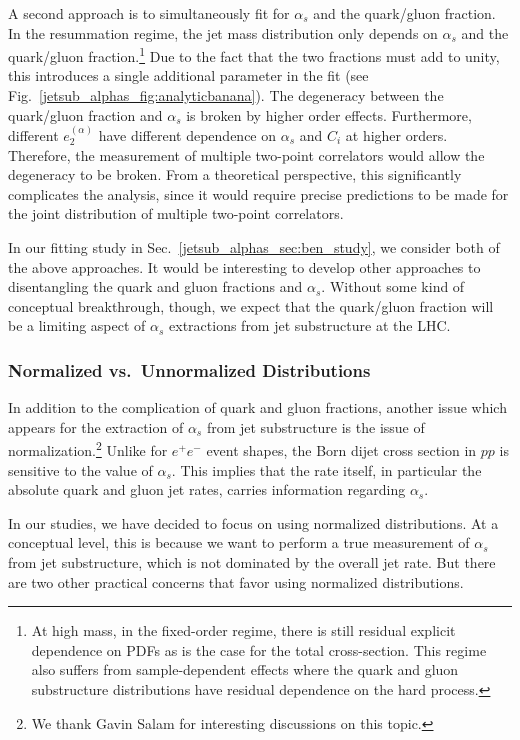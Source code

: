 \documentclass[11pt]{cernrep}
\begin{document}
A second approach is to simultaneously fit for $\alpha_s$ and the quark/gluon fraction.
%
In the resummation regime, the jet mass distribution only depends on $\alpha_s$ and the quark/gluon fraction.\footnote{At high mass, in the fixed-order regime, there is still residual explicit dependence on PDFs as is the case for the total cross-section.  This regime also suffers from sample-dependent effects where the quark and gluon substructure distributions have residual dependence on the hard process.}
%
Due to the fact that the two fractions must add to unity, this introduces a single additional parameter in the fit (see Fig.~\ref{jetsub_alphas_fig:analyticbanana}).
%
The degeneracy between the quark/gluon fraction and $\alpha_s$ is broken by higher order effects.
%
Furthermore, different $e_2^{(\alpha)}$ have different dependence on $\alpha_s$ and $C_i$ at higher orders.
%
Therefore, the measurement of multiple two-point correlators would allow the degeneracy to be broken.
%
From a theoretical perspective, this significantly complicates the analysis, since it would require precise
predictions to be made for the joint distribution of multiple two-point correlators.


In our fitting study in Sec.~\ref{jetsub_alphas_sec:ben_study}, we consider both of the above approaches.
%
It would be interesting to develop other approaches to disentangling the quark and gluon fractions and $\alpha_s$.
%
Without some kind of conceptual breakthrough, though, we expect that the quark/gluon fraction will be a limiting aspect of $\alpha_s$ extractions from jet substructure at the LHC.

\subsubsection{Normalized vs.\ Unnormalized Distributions}
\label{subjetsub_alphas_sec:norm}

In addition to the complication of quark and gluon fractions, another issue which appears for the extraction of $\alpha_s$ from jet substructure is the issue of normalization.\footnote{We thank Gavin Salam for interesting discussions on this topic. }
%
Unlike for $e^+e^-$ event shapes, the Born dijet cross section in $pp$ is sensitive to the value of $\alpha_s$.
%
This implies that the rate itself, in particular the absolute quark and gluon jet rates, carries information regarding $\alpha_s$. 

In our studies, we have decided to focus on using normalized distributions.
%
At a conceptual level, this is because we want to perform a true measurement of $\alpha_s$ from jet substructure, which is not dominated by the overall jet rate.
%
But there are two other practical concerns that favor using normalized distributions.
\end{document}
